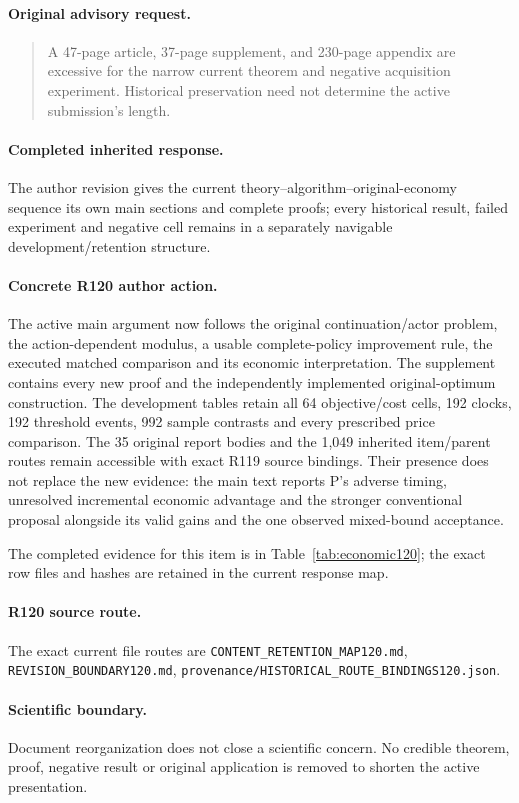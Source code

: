 \paragraph{Original advisory request.}
\begin{quote}
A 47-page article, 37-page supplement, and 230-page appendix are excessive for the narrow current theorem and negative acquisition experiment. Historical preservation need not determine the active submission's length.
\end{quote}
\paragraph{Completed inherited response.}
The author revision gives the current theory--algorithm--original-economy sequence its own main sections and complete proofs; every historical result, failed experiment and negative cell remains in a separately navigable development/retention structure.
\paragraph{Concrete R120 author action.}
The active main argument now follows the original continuation/actor problem, the action-dependent modulus, a usable complete-policy improvement rule, the executed matched comparison and its economic interpretation. The supplement contains every new proof and the independently implemented original-optimum construction. The development tables retain all 64 objective/cost cells, 192 clocks, 192 threshold events, 992 sample contrasts and every prescribed price comparison. The 35 original report bodies and the 1,049 inherited item/parent routes remain accessible with exact R119 source bindings. Their presence does not replace the new evidence: the main text reports P's adverse timing, unresolved incremental economic advantage and the stronger conventional proposal alongside its valid gains and the one observed mixed-bound acceptance.

The completed evidence for this item is in Table~\ref{tab:economic120}; the exact row files and hashes are retained in the current response map.
\paragraph{R120 source route.}
The exact current file routes are \nolinkurl{CONTENT_RETENTION_MAP120.md}, \nolinkurl{REVISION_BOUNDARY120.md}, \nolinkurl{provenance/HISTORICAL_ROUTE_BINDINGS120.json}.
\paragraph{Scientific boundary.}
Document reorganization does not close a scientific concern. No credible theorem, proof, negative result or original application is removed to shorten the active presentation.

